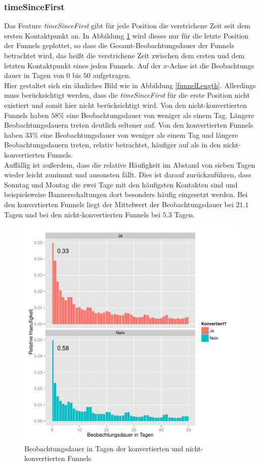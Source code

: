 \subsubsection*{timeSinceFirst}
Das Feature \textit{timeSinceFirst} gibt für jede Position die verstrichene Zeit seit dem ersten Kontaktpunkt an. In Abbildung \ref{timeSinceFirst} wird dieses nur für die letzte Position der Funnels geplottet, so dass die Gesamt-Beobachtungsdauer der Funnels betrachtet wird, das heißt die verstrichene Zeit zwischen dem ersten und dem letzten Kontaktpunkt eines jeden Funnels. Auf der $x$-Achse ist die Beobachtungs dauer in Tagen von $0$ bis $50$ aufgetragen.\\
Hier gestaltet sich ein ähnliches Bild wie in Abbildung \ref{funnelLength}. Allerdings muss berücksichtigt werden, dass die \textit{timeSinceFirst} für die erste Position nicht existiert und somit hier nicht berücksichtigt wird. Von den nicht-konvertierten Funnels haben $58 \%$ eine Beobachtungsdauer von weniger als einem Tag. Längere Beobachtungsdauern treten deutlich seltener auf. Von den konvertierten Funnels haben $33 \%$ eine Beobachtungsdauer von weniger als einem Tag und längere Beobachtungsdauern treten, relativ betrachtet, häufiger auf als in den nicht-konvertierten Funnels.\\
Auffällig ist außerdem, dass die relative Häufigkeit im Abstand von sieben Tagen wieder leicht zunimmt und ansonsten fällt. Dies ist darauf zurückzuführen, dass Sonntag und Montag die zwei Tage mit den häufigsten Kontakten sind und beispielsweise Bannerschaltungen dort besonders häufig eingesetzt werden. Bei den konvertierten Funnels liegt der Mittelwert der Beobachtungsdauer bei $21.1$ Tagen und bei den nicht-konvertierten Funnels bei $5.3$ Tagen. 
\begin{figure}[H]
    \centering
    \includegraphics[scale=0.5]{timeSinceFirst_Last.pdf}
    \caption{Beobachtungsdauer in Tagen der konvertierten und nicht-konvertierten Funnels}
    \label{timeSinceFirst}
\end{figure}

